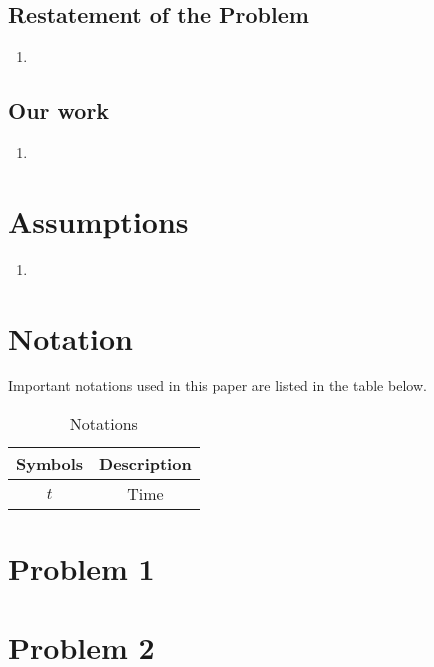 \documentclass[UTF8]{mcmthesis}
\begin{document}
        \subsection{Restatement of the Problem}
            \begin{enumerate}
                \item 
            \end{enumerate}
        \subsection{Our work}
            \begin{enumerate}
                \item 
            \end{enumerate}
            

    \section{Assumptions}
        \begin{enumerate}
            \item 
        \end{enumerate}
        

    \section{Notation}
        \hspace*{2em}Important notations used in this paper are listed in the table below.
        \vspace{-.5em}
        \begin{table}[htbp]
            \centering
            \caption{Notations}
            \vspace{0.5em}
            \begin{tabular}{cc}
                \toprule                %
                    \textbf{Symbols} & \textbf{Description} \\ 
                \midrule                %
                    $t$ & Time \\
                \bottomrule             %
            \end{tabular}
        \end{table}


    \section{Problem 1}
    \section{Problem 2}
\end{document}
